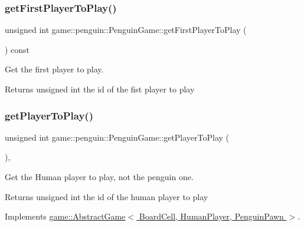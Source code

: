 \subsubsection{\texorpdfstring{get\+First\+Player\+To\+Play()}{getFirstPlayerToPlay()}}
{\footnotesize\ttfamily unsigned int game\+::penguin\+::\+Penguin\+Game\+::get\+First\+Player\+To\+Play (\begin{DoxyParamCaption}{ }\end{DoxyParamCaption}) const}



Get the first player to play. 

\begin{DoxyReturn}{Returns}
unsigned int the id of the fist player to play 
\end{DoxyReturn}
\mbox{\label{classgame_1_1penguin_1_1_penguin_game_aac449b76f27098b1d2218cc51e7f70b4}} 
\subsubsection{\texorpdfstring{get\+Player\+To\+Play()}{getPlayerToPlay()}}
{\footnotesize\ttfamily unsigned int game\+::penguin\+::\+Penguin\+Game\+::get\+Player\+To\+Play (\begin{DoxyParamCaption}{ }\end{DoxyParamCaption})\hspace{0.3cm}{\ttfamily [override]}, {\ttfamily [virtual]}}



Get the Human player to play, not the penguin one. 

\begin{DoxyReturn}{Returns}
unsigned int the id of the human player to play 
\end{DoxyReturn}


Implements \hyperlink{classgame_1_1_abstract_game_a059d72564d4658be3c246d8865080d92}{game\+::\+Abstract\+Game$<$ Board\+Cell, Human\+Player, Penguin\+Pawn $>$}.

